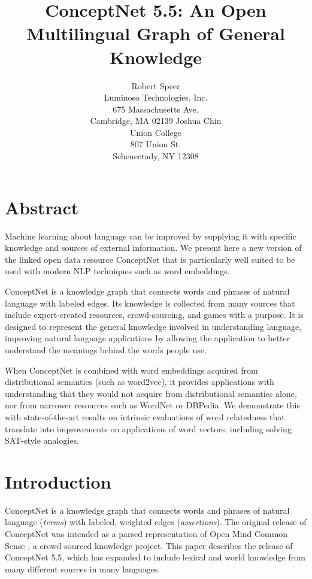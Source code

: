 \documentclass[letterpaper]{article}
\begin{document}
\title{ConceptNet 5.5: An Open Multilingual Graph of General Knowledge}
\author{
    Robert Speer \\ Luminoso Technologies, Inc. \\ 675 Massachusetts Ave. \\ Cambridge, MA 02139
    \And
    Joshua Chin \\ Union College \\ 807 Union St. \\ Schenectady, NY 12308
}

\maketitle


\section{Abstract}\label{abstract}

Machine learning about language can be improved by supplying it with specific knowledge and sources of external information. We present here a new version of the linked open data resource ConceptNet that is particularly well suited to be used with modern NLP techniques such as word embeddings.

ConceptNet is a knowledge graph that connects words and phrases of natural language with labeled edges. Its knowledge is collected from many sources that include expert-created resources, crowd-sourcing, and games with a purpose. It is designed to represent the general knowledge involved in understanding language, improving natural language applications by allowing the application
to better understand the meanings behind the words people use.

When ConceptNet is combined with word embeddings acquired from distributional semantics (such as word2vec), it provides applications with understanding that they would not acquire from distributional semantics alone, nor from narrower resources such as WordNet or DBPedia. We demonstrate this with state-of-the-art results on intrinsic evaluations of word relatedness that translate into improvements on applications of word vectors, including solving SAT-style analogies.


\section{Introduction}\label{introduction}

ConceptNet is a knowledge graph that connects words and phrases of
natural language (\emph{terms}) with labeled, weighted edges
(\emph{assertions}). The original release of ConceptNet \cite{liu2004conceptnet}
was intended as a parsed representation of Open Mind Common Sense
\cite{singh2002omcs}, a crowd-sourced knowledge project. This paper
describes the release of ConceptNet 5.5, which has expanded to include
lexical and world knowledge from many different sources in many
languages.
\end{document}
